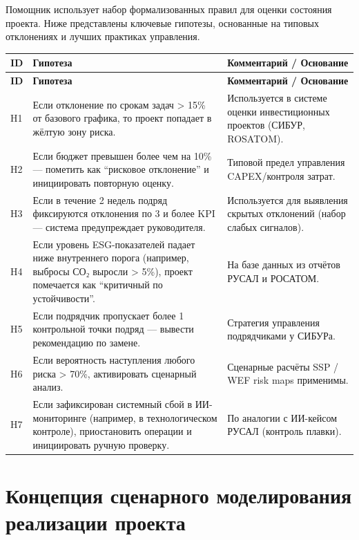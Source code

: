 \documentclass[12pt]{article}
\begin{document}
Помощник использует набор формализованных правил для оценки состояния проекта. Ниже представлены ключевые гипотезы, основанные на типовых отклонениях и лучших практиках управления.

\begin{longtable}{|p{1.2cm}|p{5.5cm}|p{8cm}|}
\hline
\textbf{ID} & \textbf{Гипотеза} & \textbf{Комментарий / Основание} \\
\hline
\endfirsthead
\hline
\textbf{ID} & \textbf{Гипотеза} & \textbf{Комментарий / Основание} \\
\hline
\endhead

H1 & Если отклонение по срокам задач > 15\% от базового графика, то проект попадает в жёлтую зону риска. & Используется в системе оценки инвестиционных проектов (СИБУР, ROSATOM). \\
\hline

H2 & Если бюджет превышен более чем на 10\% — пометить как “рисковое отклонение” и инициировать повторную оценку. & Типовой предел управления CAPEX/контроля затрат. \\
\hline

H3 & Если в течение 2 недель подряд фиксируются отклонения по 3 и более KPI — система предупреждает руководителя. & Используется для выявления скрытых отклонений (набор слабых сигналов). \\
\hline

H4 & Если уровень ESG-показателей падает ниже внутреннего порога (например, выбросы СО₂ выросли > 5\%), проект помечается как “критичный по устойчивости”. & На базе данных из отчётов РУСАЛ и РОСАТОМ. \\
\hline

H5 & Если подрядчик пропускает более 1 контрольной точки подряд — вывести рекомендацию по замене. & Стратегия управления подрядчиками у СИБУРа. \\
\hline

H6 & Если вероятность наступления любого риска > 70\%, активировать сценарный анализ. & Сценарные расчёты SSP / WEF risk maps применимы. \\
\hline

H7 & Если зафиксирован системный сбой в ИИ-мониторинге (например, в технологическом контроле), приостановить операции и инициировать ручную проверку. & По аналогии с ИИ-кейсом РУСАЛ (контроль плавки). \\
\hline

\end{longtable}

\section{Концепция сценарного моделирования реализации проекта}
\end{document}
